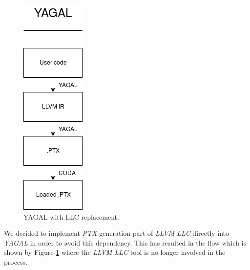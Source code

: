 \begin{figure}[!htb]
\begin{minipage}{0.4\textwidth}
        \includegraphics[width=0.5\linewidth]{chapters/implementation/figs/YAGALLLC.png}
        \caption{YAGAL with LLC replacement.}
        \label{fig:noLLC}
    \end{minipage}
\end{figure}

We decided to implement \textit{PTX} generation part of \textit{LLVM LLC} directly into \textit{YAGAL} in order to avoid this dependency. This has resulted in the flow which is shown by Figure \ref{fig:noLLC} where the \textit{LLVM LLC} tool is no longer involved in the process.

